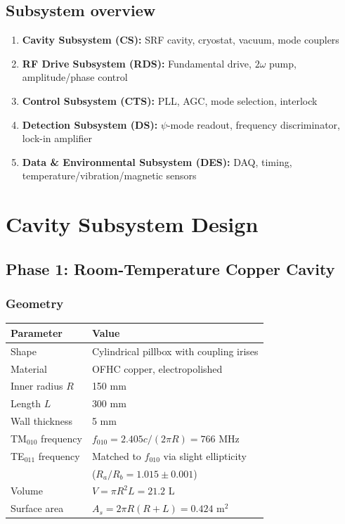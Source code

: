 \documentclass[12pt,letterpaper]{article}
\begin{document}
\subsection{Subsystem overview}

\begin{enumerate}
  \item \textbf{Cavity Subsystem (CS):} SRF cavity, cryostat, vacuum,
    mode couplers
  \item \textbf{RF Drive Subsystem (RDS):} Fundamental drive, $2\omega$
    pump, amplitude/phase control
  \item \textbf{Control Subsystem (CTS):} PLL, AGC, mode selection,
    interlock
  \item \textbf{Detection Subsystem (DS):} $\psi$-mode readout,
    frequency discriminator, lock-in amplifier
  \item \textbf{Data \& Environmental Subsystem (DES):} DAQ, timing,
    temperature/vibration/magnetic sensors
\end{enumerate}

\section{Cavity Subsystem Design}

\subsection{Phase 1: Room-Temperature Copper Cavity}

\subsubsection{Geometry}

\begin{tabular}{ll}
\toprule
Parameter & Value \\
\midrule
Shape & Cylindrical pillbox with coupling irises \\
Material & OFHC copper, electropolished \\
Inner radius $R$ & 150 mm \\
Length $L$ & 300 mm \\
Wall thickness & 5 mm \\
TM$_{010}$ frequency & $f_{010} = 2.405c/(2\pi R) = 766$ MHz \\
TE$_{011}$ frequency & Matched to $f_{010}$ via slight ellipticity \\
 & ($R_a/R_b = 1.015 \pm 0.001$) \\
Volume & $V = \pi R^2 L = 21.2$ L \\
Surface area & $A_s = 2\pi R(R + L) = 0.424$ m$^2$ \\
\bottomrule
\end{tabular}
\end{document}
